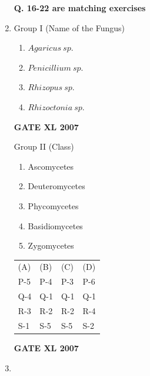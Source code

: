 \documentclass[journal,12pt,onecolumn]{IEEEtran}
\begin{document}
\begin{enumerate}
    \textbf{Q. 16-22 are matching exercises}
    \item 
	    \begin{minipage}{0.5\textwidth}
		    \begin{flushleft}
	Group I (Name of the Fungus)
    \begin{enumerate}
        \item $Agaricus\ sp.$
        \item $Penicillium\ sp.$
        \item $Rhizopus\ sp.$
        \item $Rhizoctonia\ sp.$
    \end{enumerate}\hfill{\textbf{GATE XL 2007}}
    \end{flushleft}
		    \end{minipage}
	    \begin{minipage}{0.5\textwidth}
		    \begin{flushleft}
		    Group II (Class)
    \begin{enumerate}
        \item Ascomycetes
        \item Deuteromycetes
        \item Phycomycetes
        \item Basidiomycetes
        \item Zygomycetes
    \end{enumerate}
    \end{flushleft}
		    \end{minipage}

\begin{tabular}{l l l l}
     (A) & (B) & (C) & (D) \\
     P-5 & P-4 & P-3 & P-6 \\
     Q-4 & Q-1 & Q-1 & Q-1 \\
     R-3 & R-2 & R-2 & R-4 \\
     S-1 & S-5 & S-5 & S-2 \\
    \end{tabular}
			    \hfill{\textbf{GATE XL 2007}}

    \item   


\end{enumerate}
\end{document}
